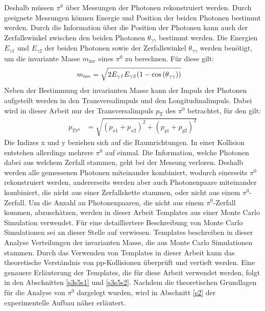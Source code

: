 Deshalb müssen $\pi^{0}$ über Messungen der Photonen rekonstruiert werden.
Durch geeignete Messungen können Energie und Position der beiden Photonen bestimmt werden.
Durch die Information über die Position der Photonen kann auch der Zerfallswinkel zwischen den beiden Photonen $\theta_{\gamma\gamma}$ bestimmt werden.
Die Energien $E_{\gamma1}$ und $E_{\gamma2}$ der beiden Photonen sowie der Zerfallswinkel $\theta_{\gamma\gamma}$ werden benötigt, um die invariante Masse $m_{\text{inv}}$ eines $\pi^{0}$ zu berechnen.
Für diese gilt:
\begin{align}
m_{\text{inv}} &= \sqrt{2E_{\gamma\it{1}}E_{\gamma\it{2}}(1-\cos\left( \theta_{\gamma\gamma}\right) )} \label{eq_invmass}
\end{align}
\newline
Neben der Bestimmung der invarianten Masse kann der Impuls der Photonen aufgeteilt werden in den Transversalimpuls und den Longitudinalimpuls.
Dabei wird in dieser Arbeit nur der Transversalimpuls $p_\text{T}$ des $\pi^{0}$ betrachtet, für den gilt:
\begin{align}
p_{T\pi^{0}} &= \sqrt{\left(p_{x1}+p_{x2}\right)^{2} +\left(p_{y1}+p_{y2}\right)^{2}} \label{eq_pt}
\end{align}
Die Indizes x und y beziehen sich auf die Raumrichtungen.
\newline
In einer Kollision entstehen allerdings mehrere $\pi^{0}$ auf einmal.
Die Information, welche Photonen dabei aus welchem Zerfall stammen, geht bei der Messung verloren.
Deshalb werden alle gemessenen Photonen miteinander kombiniert, wodurch einerseits $\pi^{0}$ rekonstruiert werden, andererseits werden aber auch Photonenpaare miteinander kombiniert, die nicht aus einer Zerfallskette stammen, oder nicht aus einem $\pi^{0}$-Zerfall.
Um die Anzahl an Photonenpaaren, die nicht aus einem $\pi^{0}$-Zerfall kommen, abzuschätzen, werden in dieser Arbeit  Templates aus einer Monte Carlo Simulation verwendet.
Für eine detailliertere Beschreibung von Monte Carlo Simulationen sei an dieser Stelle auf \cite{thesis:Krissy} verwiesen.
Templates beschreiben in dieser Analyse Verteilungen der invarianten Masse, die aus Monte Carlo Simulationen stammen.
Durch das Verwenden von Templates in dieser Arbeit kann das theoretische Verständnis von pp-Kollisionen überprüft und vertieft werden.
Eine genauere Erläuterung der Templates, die für diese Arbeit verwendet werden, folgt in den Abschnitten \ref{s3s5s1} und \ref{s3s5s2}.
\newline
Nachdem die theoretischen Grundlagen für die Analyse von $\pi^{0}$ dargelegt wurden, wird in Abschnitt \ref{s2} der experimentelle Aufbau näher erläutert.